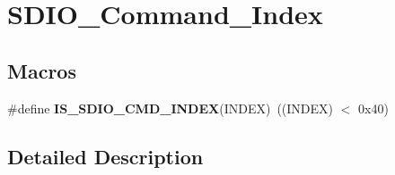 \hypertarget{group___s_d_i_o___command___index}{\section{S\-D\-I\-O\-\_\-\-Command\-\_\-\-Index}
\label{group___s_d_i_o___command___index}
}
\subsection*{Macros}
\begin{DoxyCompactItemize}
\item 
\hypertarget{group___s_d_i_o___command___index_gae988f9f37c4ebb5f5f9866acb30f2880}{\#define {\bfseries I\-S\-\_\-\-S\-D\-I\-O\-\_\-\-C\-M\-D\-\_\-\-I\-N\-D\-E\-X}(I\-N\-D\-E\-X)~((I\-N\-D\-E\-X) $<$ 0x40)}\label{group___s_d_i_o___command___index_gae988f9f37c4ebb5f5f9866acb30f2880}

\end{DoxyCompactItemize}


\subsection{Detailed Description}
